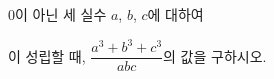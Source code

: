 \hspace*{2mm}\begin{minipage}[t]{\dimexpr\linewidth-2mm\relax}\vspace{0pt}
$0$이 아닌 세 실수 $a$, $b$, $c$에 대하여 \par\smallskip{}\par\smallskip\noindent 이 성립할 때, $\dfrac{a^3+b^3+c^3}{abc}$의 값을 구하시오.\end{minipage}
